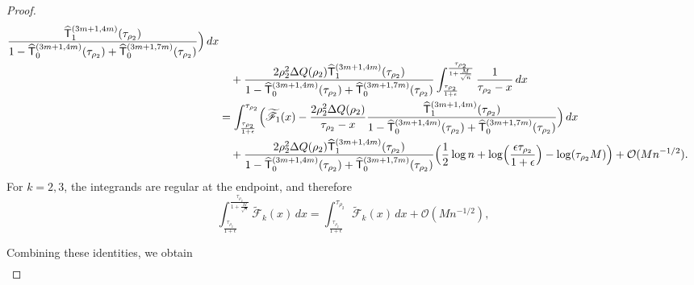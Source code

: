 \documentclass[a4paper]{article}
\numberwithin{equation}{section}
\begin{document}
\begin{proof}
\begin{align*}
\frac{
\widehat{\mathsf{T}}_{1}^{(3m+1,4m)}(\tau_{\rho_2})}{1-\widehat{\mathsf{T}}_0^{(3m+1,4m)}(\tau_{\rho_2})+\widehat{\mathsf{T}}_0^{(3m+1,7m)}(\tau_{\rho_2})}
\Bigr) \,dx 
\\
&\quad 
+
\frac{2\rho_2^2\Delta Q(\rho_2)\widehat{\mathsf{T}}_{1}^{(3m+1,4m)}(\tau_{\rho_2})}{1-\widehat{\mathsf{T}}_0^{(3m+1,4m)}(\tau_{\rho_2})+\widehat{\mathsf{T}}_0^{(3m+1,7m)}(\tau_{\rho_2})}
\int_{\frac{\tau_{\rho_2}}{1+\epsilon}}^{\frac{\tau_{\rho_2}}{1+\frac{M}{\sqrt{n}}}}
\frac{1}{\tau_{\rho_2}-x}
\,dx 
\\
&=
\int_{\frac{\tau_{\rho_2}}{1+\epsilon}}^{\tau_{\rho_2}}
\Bigl(\widetilde{\mathscr{F}}_1(x)
-\frac{2\rho_2^2\Delta Q(\rho_2)}{\tau_{\rho_2}-x}
\frac{
\widehat{\mathsf{T}}_{1}^{(3m+1,4m)}(\tau_{\rho_2})}{1-\widehat{\mathsf{T}}_0^{(3m+1,4m)}(\tau_{\rho_2})+\widehat{\mathsf{T}}_0^{(3m+1,7m)}(\tau_{\rho_2})}
\Bigr) \,dx 
\\
&\quad
+
\frac{2\rho_2^2\Delta Q(\rho_2)\widehat{\mathsf{T}}_{1}^{(3m+1,4m)}(\tau_{\rho_2})}{1-\widehat{\mathsf{T}}_0^{(3m+1,4m)}(\tau_{\rho_2})+\widehat{\mathsf{T}}_0^{(3m+1,7m)}(\tau_{\rho_2})}
\Bigl( 
\frac{1}{2}\log n +\log\Bigl(\frac{\epsilon\tau_{\rho_2}}{1+\epsilon}\Bigr)-\log (\tau_{\rho_2}M)
\Bigr)
+\mathcal{O}(Mn^{-1/2}).
\end{align*}
For $k=2,3$, the integrands are regular at the endpoint, and therefore
\[
\int_{\frac{\tau_{\rho_2}}{1+\epsilon}}^{\frac{\tau_{\rho_2}}{1+\frac{M}{\sqrt{n}}}}
\widetilde{\mathscr{F}}_k(x)\,dx
=
\int_{\frac{\tau_{\rho_2}}{1+\epsilon}}^{\tau_{\rho_2}}
\widetilde{\mathscr{F}}_k(x)\,dx
+\mathcal{O}(Mn^{-1/2}), 
\]

Combining these identities, we obtain
\begin{align*}

\end{align*}
\end{proof}
\end{document}
